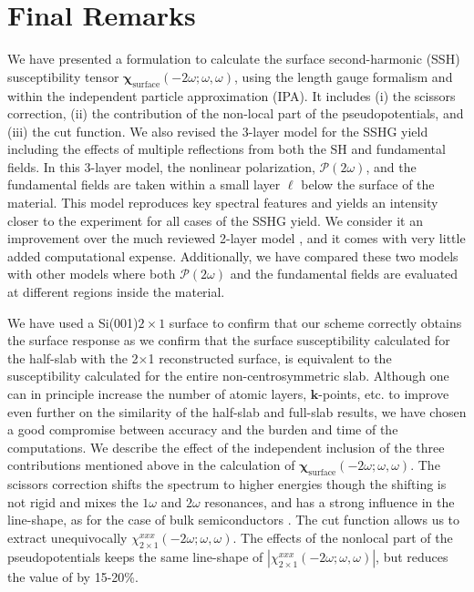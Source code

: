 \chapter{Final Remarks}\label{chap:conclusions}

We have presented a formulation to calculate the surface second-harmonic (SSH)
susceptibility tensor
$\boldsymbol{\chi}_{\mathrm{surface}}(-2\omega;\omega,\omega)$, using the length
gauge formalism and within the independent particle approximation (IPA). It
includes (i) the scissors correction, (ii) the contribution of the non-local
part of the pseudopotentials, and (iii) the cut function. We also revised the
3-layer model for the SSHG yield including the effects of multiple reflections
from both the SH and fundamental fields. In this 3-layer model,  the nonlinear
polarization, $\boldsymbol{\mathcal{P}}(2\omega)$, and the fundamental fields
are taken within a small layer $\ell$ below the surface of the material. This
model reproduces key spectral features and yields an intensity closer to the
experiment for all cases of the SSHG yield. We consider it an
improvement over the much reviewed 2-layer model \cite{mizrahiJOSA88}, and it
comes with very little added computational expense. Additionally, we have
compared these two models with other models where both
$\boldsymbol{\mathcal{P}}(2\omega)$ and the fundamental fields are evaluated at
different regions inside the material.

We have used a Si(001)$2\times 1$ surface to confirm that our scheme correctly
obtains the surface response as we confirm that the surface susceptibility
calculated for the half-slab with the 2$\times$1 reconstructed surface, is
equivalent to the susceptibility calculated for the entire non-centrosymmetric
slab. Although one can in principle increase the number of atomic layers,
$\mathbf{k}$-points, etc. to improve even further on the similarity of the
half-slab and full-slab results, we have chosen a good compromise between
accuracy and the burden and time of the computations. We describe the effect of
the independent inclusion of the three contributions mentioned above in the
calculation of $\boldsymbol{\chi}_{\mathrm{surface}}(-2\omega;\omega,\omega)$.
The scissors correction shifts the spectrum to higher energies though the
shifting is not rigid and mixes the $1\omega$ and $2\omega$ resonances, and has
a strong influence in the line-shape, as for the case of bulk semiconductors
\cite{luppiJCP10, luppiPRB10, leitsmannPRB05}. The cut function allows us to
extract unequivocally $\chi^{xxx}_{2\times 1}(-2\omega;\omega,\omega)$. The
effects of the nonlocal part of the pseudopotentials keeps the same line-shape
of $|\chi^{xxx}_{2\times 1}(-2\omega;\omega,\omega)|$, but reduces the value of
by 15-20\%.

